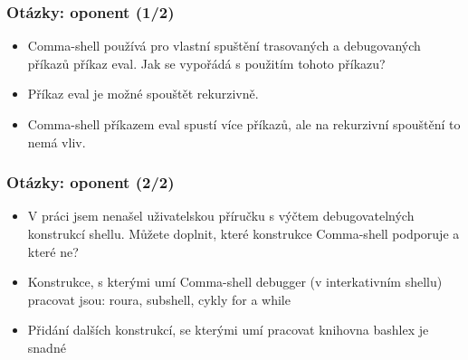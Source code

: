 \documentclass{beamer}
\newcommand{\backupend}{
   \setcounter{framenumber}{\value{finalframe}}
}
\begin{document}
\begin{frame}
	\frametitle{Otázky: oponent (1/2)}
	\begin{exampleblock}{}
		\begin{itemize}
			\item Comma-shell používá pro vlastní spuštění trasovaných a debugovaných příkazů příkaz eval.
Jak se vypořádá s použitím tohoto příkazu?
		\end{itemize}
	\end{exampleblock}
	\begin{alertblock}{}
	   \begin{itemize}
			\item Příkaz eval je možné spouštět rekurzivně.
			\item Comma-shell příkazem eval spustí více příkazů, ale na rekurzivní spouštění to nemá vliv.
		\end{itemize}
	\end{alertblock}	
\end{frame}

\begin{frame}
	\frametitle{Otázky: oponent (2/2)}
	\begin{exampleblock}{}
		\begin{itemize}
			\item V práci jsem nenašel uživatelskou příručku s výčtem debugovatelných konstrukcí shellu.
Můžete doplnit, které konstrukce Comma-shell podporuje a které ne?
		\end{itemize}
	\end{exampleblock}
	\begin{alertblock}{}
	   \begin{itemize}
			\item Konstrukce, s kterými umí Comma-shell debugger (v interkativním shellu) pracovat jsou: roura, subshell, cykly for a while
			\item Přidání dalších konstrukcí, se kterými umí pracovat knihovna bashlex je snadné
		\end{itemize}
	\end{alertblock}	
\end{frame}


\backupend
\end{document}
